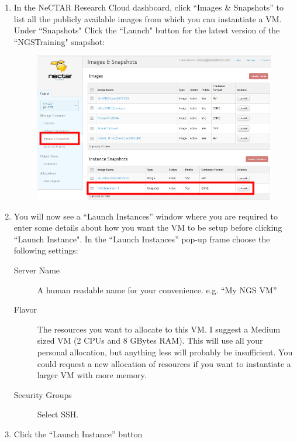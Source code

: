 \begin{enumerate}
  \item In the NeCTAR Research Cloud dashboard, click ``Images \& Snapshots''
  to list all the publicly available images from which you can instantiate a
  VM. Under ``Snapshots" Click the ``Launch" button for the latest version of the
  ``NGSTraining" snapshot:
  \begin{figure}[H]
    \centering
    \includegraphics[scale=0.5]{handout/nectar/dashboard_snapshots.png}
    \caption{\label{fig:dashboard_snapshots}}
  \end{figure}
  \item You will now see a ``Launch Instances'' window where you are required to
  enter some details about how you want the VM to be setup before clicking
  ``Launch Instance".
  In the ``Launch Instances'' pop-up frame choose the following settings:
  \begin{description}
  \item[Server Name] A human readable name for your convenience. e.g. ``My NGS VM''
  \item[Flavor] The resources you want to allocate to this VM. I suggest a
  Medium sized VM (2 CPUs and 8 GBytes RAM). This will use all your personal
  allocation, but anything less will probably be insufficient. You could request
  a new allocation of resources if you want to instantiate a larger VM with more
  memory.
  \item[Security Groups] Select SSH.
  \end{description}
  \item Click the ``Launch Instance'' button
  \begin{figure}[H]
    \centering

\end{figure}
\end{enumerate}
